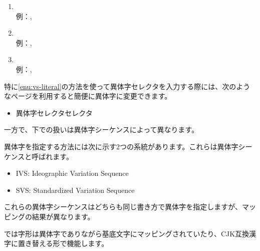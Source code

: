 \documentclass[../supplement]{subfiles}
\begin{document}
\begin{enumerate}[itemsep=0.7zw]
  \item {}
    \\\tab
      例：,
    \label{enu:vs-literal}
  \item {}
    \\\tab
      例：,
  \item {}
    \\\tab
      例：,
\end{enumerate}

特に\ref{enu:vs-literal}の方法を使って異体字セレクタを入力する際には、次のようなページを利用すると簡便に異体字に変更できます。

\begin{itemize}
  \item 異体字セレクタセレクタ
\end{itemize}

一方で、{\upLaTeXdvipdfmx}下での扱いは異体字シーケンスによって異なります。

異体字を指定する方法には次に示す2つの系統があります。これらは異体字シーケンスと呼ばれます。

\begin{itemize}
  \item IVS: Ideographic Variation Sequence
  \item SVS: Standardized Variation Sequence
\end{itemize}

これらの異体字シーケンスはどちらも同じ書き方で異体字を指定しますが、マッピングの結果が異なります。

{\upLaTeXdvipdfmx}では字形は異体字でありながら基底文字にマッピングされていたり、CJK互換漢字に置き替える形で機能します。
\end{document}
